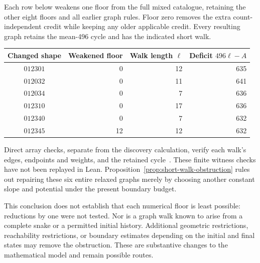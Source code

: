 Each row below weakens one floor from the full mixed catalogue, retaining the other eight floors and all earlier graph rules. Floor zero removes the extra count-independent credit while keeping any older applicable credit. Every resulting graph retains the mean-496 cycle and has the indicated short walk.
\begin{center}\small
\begin{tabular}{c r r r}
\toprule
Changed shape & Weakened floor & Walk length $\ell$ & Deficit $496\ell-A$\\\midrule
$012301$ & 0 & 12 & 635\\
$012032$ & 0 & 11 & 641\\
$012034$ & 0 & 7 & 636\\
$012310$ & 0 & 17 & 636\\
$012340$ & 0 & 7 & 632\\
$012345$ & 12 & 12 & 632\\
\bottomrule
\end{tabular}
\end{center}
Direct array checks, separate from the discovery calculation, verify each walk's edges, endpoints and weights, and the retained cycle~\cite{obstructionarchive}. These finite witness checks have not been replayed in Lean. Proposition~\ref{prop:short-walk-obstruction} rules out repairing these six entire relaxed graphs merely by choosing another constant slope and potential under the present boundary budget.

This conclusion does not establish that each numerical floor is least possible: reductions by one were not tested. Nor is a graph walk known to arise from a complete snake or a permitted initial history. Additional geometric restrictions, reachability restrictions, or boundary estimates depending on the initial and final states may remove the obstruction. These are substantive changes to the mathematical model and remain possible routes.

